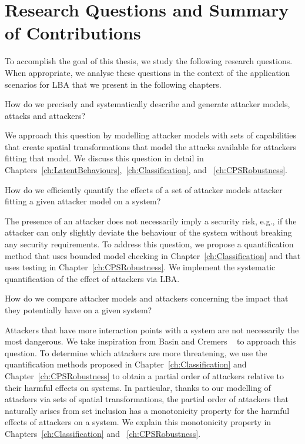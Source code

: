 \section{Research Questions and Summary of Contributions}
\label{sec:Introduction:ResearchQuestions}
To accomplish the goal of this thesis, we study the following research questions. When appropriate, we analyse these questions in the context of the application scenarios for LBA that we present in the following chapters. 
\begin{question}
\label{que:AttackerModel}
How do we precisely and systematically describe and generate attacker models, attacks and attackers?
\end{question}
We approach this question by modelling attacker models with sets of capabilities that create spatial transformations that model the attacks available for attackers fitting that model. We discuss this question in detail in Chapters~\ref{ch:LatentBehaviours},~\ref{ch:Classification}, and ~\ref{ch:CPSRobustness}.
\begin{question}
\label{que:Quantification}
How do we efficiently quantify the effects of a set of attacker models attacker fitting a given attacker model on a system? 
\end{question}
The presence of an attacker does not necessarily imply a security risk, e.g., if the attacker can only slightly deviate the behaviour of the system without breaking any security requirements. To address this question, we propose a quantification method that uses bounded model checking in Chapter~\ref{ch:Classification} and that uses testing in Chapter~\ref{ch:CPSRobustness}. We implement the systematic quantification of the effect of attackers via LBA. 

\begin{question}
\label{que:Classification}
How do we compare attacker models and attackers concerning the impact that they potentially have on a given system?
\end{question}
Attackers that have more interaction points with a system are not necessarily the most dangerous. We take inspiration from Basin and Cremers ~\cite{KnowYourEnemy} to approach this question. To determine which attackers are more threatening, we use the quantification methods proposed in Chapter~\ref{ch:Classification} and Chapter~\ref{ch:CPSRobustness} to obtain a partial order of attackers relative to their harmful effects on systems. In particular, thanks to our modelling of attackers via sets of spatial transformations, the partial order of attackers that naturally arises from set inclusion has a monotonicity property for the harmful effects of attackers on a system. We explain this monotonicity property in Chapters~\ref{ch:Classification} and ~\ref{ch:CPSRobustness}.

